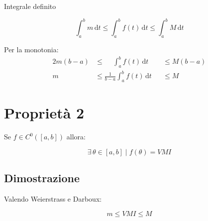 \documentclass[../dimostrazioni]{subfiles}
\begin{document}
            Integrale definito

            \[\int_{a}^{b} \! m \, \mathrm{d} t \leqslant \int_{a}^{b} \! f(t) \, \mathrm{d} t \leqslant \int_{a}^{b} \! M \, \mathrm{d} t\]

            Per la monotonia:
            \begin{alignat*}{2}
                m(b-a) &\leqslant \quad \: \int_{a}^{b} \! f(t) \, \mathrm{d} t &&\leqslant M(b-a) \\
                m &\leqslant \frac{1}{b-a} \int_{a}^{b} \! f(t) \, \mathrm{d} t &&\leqslant M
            \end{alignat*}

    \section*{Proprietà 2}

        Se \(f \in C^0 ([a,b]) \) allora:


        \[\exists \, \theta\in [a, b] \mid f(\theta) = VMI \]

        \subsection*{Dimostrazione}
    
            Valendo Weierstrass e Darboux:

            \[m \leqslant VMI \leqslant M \]
\end{document}
